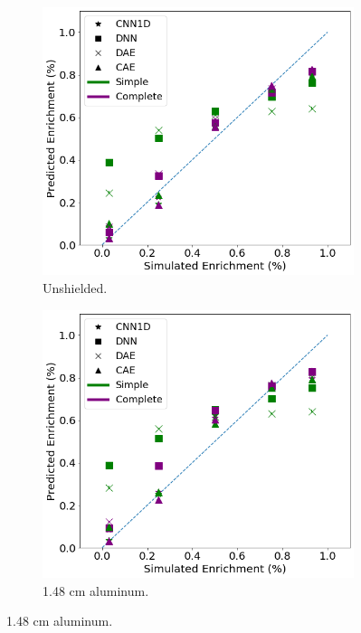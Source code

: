 \begin{figure}[H]
     \centering
     \begin{subfigure}[b]{0.49\textwidth}
         \centering
         \includegraphics[width=\textwidth]{images/simuranium-noshield.png}
         \caption{Unshielded.}
         \label{fig:simuranium-noshield}
     \end{subfigure}
     \hfill
     \begin{subfigure}[b]{0.49\textwidth}
         \centering
         \includegraphics[width=\textwidth]{images/simuranium-lightal.png}
         \caption{1.48 cm aluminum.}
         \label{fig:simuranium-lightal}
     \end{subfigure}


\end{figure}

